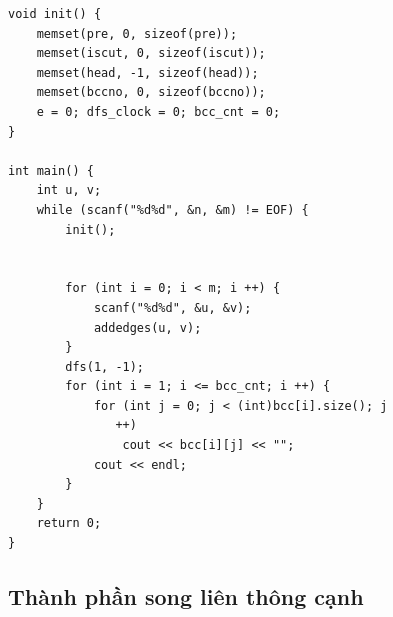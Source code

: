 \documentclass[11pt]{article}
\begin{document}
\begin{verbatim}
void init() {
    memset(pre, 0, sizeof(pre));
    memset(iscut, 0, sizeof(iscut));
    memset(head, -1, sizeof(head));
    memset(bccno, 0, sizeof(bccno));
    e = 0; dfs_clock = 0; bcc_cnt = 0;
}

int main() {
    int u, v;
    while (scanf("%d%d", &n, &m) != EOF) {
        init();


        for (int i = 0; i < m; i ++) {
            scanf("%d%d", &u, &v);
            addedges(u, v);
        }
        dfs(1, -1);
        for (int i = 1; i <= bcc_cnt; i ++) {
            for (int j = 0; j < (int)bcc[i].size(); j
               ++)
                cout << bcc[i][j] << "";
            cout << endl;
        }
    }
    return 0;
}
\end{verbatim}
\endgroup

\subsection{Thành phần song liên thông cạnh}
\end{document}
